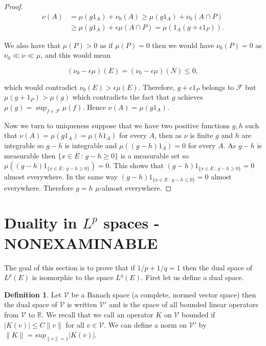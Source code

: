 \documentclass[
]{book}
\theoremstyle{definition}
\newtheorem{definition}{Definition}[chapter]
\theoremstyle{definition}
\theoremstyle{definition}
\theoremstyle{definition}
\theoremstyle{remark}
\begin{document}
\begin{proof}
\begin{align*}
\nu(A) &= \mu(g1_A) + \nu_0(A) \geq \mu(g1_A) + \nu_0(A \cap P) \\
& \geq \mu(g1_A) + \epsilon \mu(A \cap P) = \mu(1_A(g +\epsilon 1_{P})).
\end{align*}

We also have that \(\mu(P) >0\) as if \(\mu(P) = 0\) then we would have \(\nu_0(P)=0\) as \(\nu_0 \ll \nu \ll \mu\), and this would mean

\[ (\nu_0 - \epsilon \mu)(E) = (\nu_0 - \epsilon \mu)(N) \leq 0, \]

which would contradict \(\nu_0(E) > \epsilon \mu(E)\). Therefore, \(g+ \epsilon 1_P\) belongs to \(\mathcal{F}\) but \(\mu(g+1_P) > \mu(g)\) which contradicts the fact that \(g\) achieves \(\mu(g) = \sup_{f \in \mathcal{F}} \mu(f)\). Hence \(\nu(A) = \mu(g1_A)\).

Now we turn to uniqueness suppose that we have two positive functions \(g,h\) such that \(\nu(A) = \mu(g1_A) = \mu(h1_A)\) for every \(A\), then as \(\nu\) is finite \(g\) and \(h\) are integrable so \(g-h\) is integrable and \(\mu((g-h)1_A) = 0\) for every \(A\). As \(g-h\) is measurable then \(\{x \in E\,:\, g-h \geq 0\}\) is a measurable set so \(\mu((g-h)1_{\{x \in E\,:\, g-h \geq 0\}}) = 0\). This shows that \((g-h)1_{\{x \in E\,:\, g-h \geq 0\}} = 0\) almost everywhere. In the same way \((g-h)1_{\{ x \in E\,:\, g-h \leq 0\}} =0\) almost everywhere. Therefore \(g=h\) \(\mu\)-almost everywhere.
\end{proof}

\hypertarget{duality-in-lp-spaces---nonexaminable}{%
\section{\texorpdfstring{Duality in \(L^p\) spaces - NONEXAMINABLE}{Duality in L\^{}p spaces - NONEXAMINABLE}}\label{duality-in-lp-spaces---nonexaminable}}

The goal of this section is to prove that if \(1/p+1/q =1\) then the dual space of \(L^p(E)\) is isomorphic to the space \(L^q(E)\). First let us define a dual space.

\begin{definition}
Let \(\mathcal{V}\) be a Banach space (a complete, normed vector space) then the dual space of \(\mathcal{V}\) is written \(\mathcal{V}'\) and is the space of all bounded linear operators from \(\mathcal{V}\) to \(\mathbb{R}\). We recall that we call an operator \(K\) on \(\mathcal{V}\) bounded if \(|K(v)| \leq C\|v\|\) for all \(v \in \mathcal{V}\). We can define a norm on \(\mathcal{V}'\) by \(\|K\| = sup_{\|v\| =1}|K(v)|\).
\end{definition}
\end{document}

